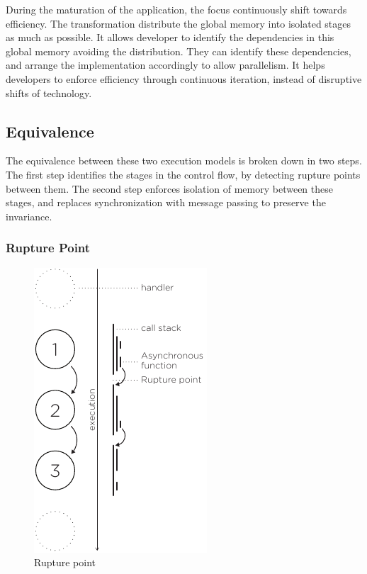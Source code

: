 During the maturation of the application, the focus continuously shift towards efficiency.
The transformation distribute the global memory into isolated stages as much as possible.
It allows developer to identify the dependencies in this global memory avoiding the distribution.
They can identify these dependencies, and arrange the implementation accordingly to allow parallelism.
It helps developers to enforce efficiency through continuous iteration, instead of disruptive shifts of technology.




\subsection{Equivalence} \label{chapter4:equivalence}

The equivalence between these two execution models is broken down in two steps. %
The first step identifies the stages in the control flow, by detecting rupture points between them.
The second step enforces isolation of memory between these stages, and replaces synchronization with message passing to preserve the invariance.

\subsubsection{Rupture Point}

\begin{figure}
  \vspace{-10pt}
  \begin{center}
    \includegraphics[height=0.4\textwidth]{../resources/rupture-point.pdf}
    \caption{Rupture point}
    \label{fig:rupture-point}
  \end{center}
  \vspace{-10pt}
\end{figure}

